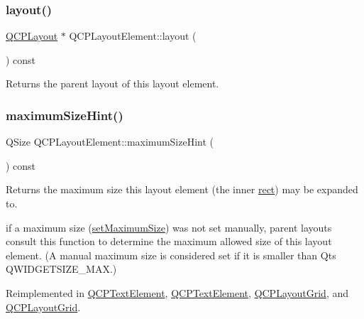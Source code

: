 \subsubsection{\texorpdfstring{layout()}{layout()}}
{\footnotesize\ttfamily \hyperlink{class_q_c_p_layout}{Q\+C\+P\+Layout} $\ast$ Q\+C\+P\+Layout\+Element\+::layout (\begin{DoxyParamCaption}{ }\end{DoxyParamCaption}) const\hspace{0.3cm}{\ttfamily [inline]}}

Returns the parent layout of this layout element. \mbox{\label{class_q_c_p_layout_element_ab5ce2ba22b36d9a3b70a1be562c326e5}} 
\subsubsection{\texorpdfstring{maximum\+Size\+Hint()}{maximumSizeHint()}}
{\footnotesize\ttfamily Q\+Size Q\+C\+P\+Layout\+Element\+::maximum\+Size\+Hint (\begin{DoxyParamCaption}{ }\end{DoxyParamCaption}) const\hspace{0.3cm}{\ttfamily [virtual]}}

Returns the maximum size this layout element (the inner \hyperlink{class_q_c_p_layout_element_a208effccfe2cca4a0eaf9393e60f2dd4}{rect}) may be expanded to.

if a maximum size (\hyperlink{class_q_c_p_layout_element_a74eb5280a737ab44833d506db65efd95}{set\+Maximum\+Size}) was not set manually, parent layouts consult this function to determine the maximum allowed size of this layout element. (A manual maximum size is considered set if it is smaller than Qt\textquotesingle{}s Q\+W\+I\+D\+G\+E\+T\+S\+I\+Z\+E\+\_\+\+M\+AX.) 

Reimplemented in \hyperlink{class_q_c_p_text_element_a65e5f4c5a852bbff48acef236048354f}{Q\+C\+P\+Text\+Element}, \hyperlink{class_q_c_p_text_element_a174551b248c8960d1b250bbe04e1b20c}{Q\+C\+P\+Text\+Element}, \hyperlink{class_q_c_p_layout_grid_acb285925df25b54b3db25c7b1804d230}{Q\+C\+P\+Layout\+Grid}, and \hyperlink{class_q_c_p_layout_grid_a22505c47e97c26621116072994e70cf3}{Q\+C\+P\+Layout\+Grid}.


